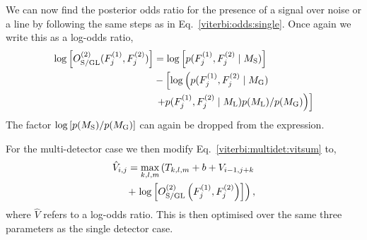 %
We can now find the posterior odds ratio for the presence of a signal over noise or a line by following the same steps as in Eq.~\ref{viterbi:odds:single}. Once again we write this as a log-odds ratio,
\begin{equation}
\begin{split}
\label{viterbi:lineaware:logodds}
\log\left[ O^{(2)}_{\rm{S/GL}}(F^{(1)}_{j},F^{(2)}_{j})\right] &=  \log\left[ p(F^{(1)}_{j},F^{(2)}_{j} \mid M_{\rm{S}}) \right] \\
&- \left[ \log\left( p(F^{(1)}_{j},F^{(2)}_{j}\mid M_{\rm{G}}) \right. \right. \\
&\left.\left.+  p(F^{(1)}_{j},F^{(2)}_{j}\mid M_{\rm{L}})p(M_{\rm{L}})/p(M_{\rm{G}})\right) \right]
\end{split}
\end{equation}
The factor $\log\left[ p(M_{\rm{S}})/p(M_{\rm{G}})\right]$ can again be dropped from the expression.

For the multi-detector case we then modify Eq.~\ref{viterbi:multidet:vitsum} to,
\begin{equation}
\begin{split}
\label{viterbi:lineaware:stat:multi}
\hat{V}_{i,j} = \max_{k,l,m}\left(T_{k,l,m} + b + V_{i-1,j+k}   \right. \\
 + \left.  \log\left[O^{(2)}_{\rm{S/GL}}\left(F^{(1)}_{j},F^{(2)}_{j}\right)\right]\right),
\end{split}
\end{equation}
%
where $\hat{V}$ refers to a log-odds ratio.
This is then optimised over the same three parameters as the single detector case.

